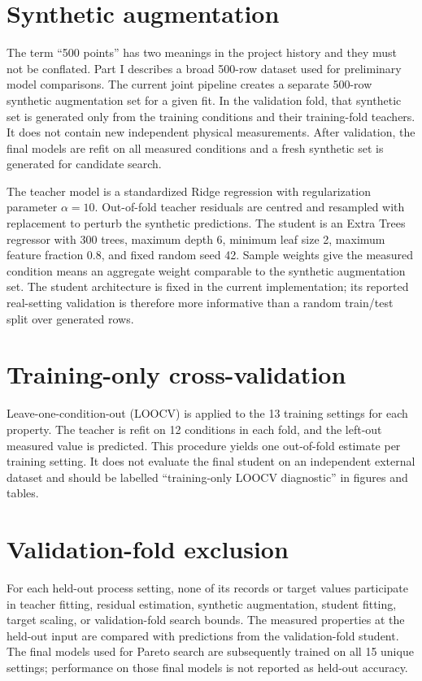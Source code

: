 \documentclass[12pt,a4paper,oneside]{report}
\begin{document}
\section{Synthetic augmentation}
The term ``500 points'' has two meanings in the project history and they must not be conflated. Part I describes a broad 500-row dataset used for preliminary model comparisons. The current joint pipeline creates a separate 500-row synthetic augmentation set for a given fit. In the validation fold, that synthetic set is generated only from the training conditions and their training-fold teachers. It does not contain new independent physical measurements. After validation, the final models are refit on all measured conditions and a fresh synthetic set is generated for candidate search.

The teacher model is a standardized Ridge regression with regularization parameter $\alpha=10$. Out-of-fold teacher residuals are centred and resampled with replacement to perturb the synthetic predictions. The student is an Extra Trees regressor with 300 trees, maximum depth 6, minimum leaf size 2, maximum feature fraction 0.8, and fixed random seed 42. Sample weights give the measured condition means an aggregate weight comparable to the synthetic augmentation set. The student architecture is fixed in the current implementation; its reported real-setting validation is therefore more informative than a random train/test split over generated rows.

\section{Training-only cross-validation}
Leave-one-condition-out (LOOCV) is applied to the 13 training settings for each property. The teacher is refit on 12 conditions in each fold, and the left-out measured value is predicted. This procedure yields one out-of-fold estimate per training setting. It does not evaluate the final student on an independent external dataset and should be labelled ``training-only LOOCV diagnostic'' in figures and tables.

\section{Validation-fold exclusion}
For each held-out process setting, none of its records or target values participate in teacher fitting, residual estimation, synthetic augmentation, student fitting, target scaling, or validation-fold search bounds. The measured properties at the held-out input are compared with predictions from the validation-fold student. The final models used for Pareto search are subsequently trained on all 15 unique settings; performance on those final models is not reported as held-out accuracy.
\end{document}
